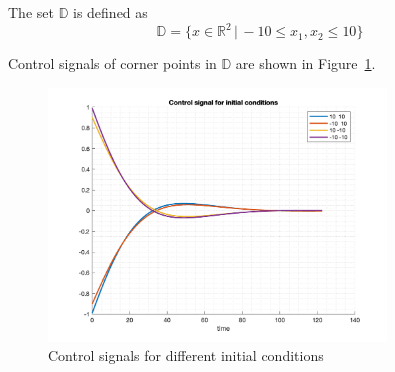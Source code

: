 The set $\mathbb{D}$ is defined as 
\begin{equation}
    \mathbb{D}=\{x\in\mathbb{R}^2\,|\,-10\leq x_1,x_2\leq 10\}
\end{equation}

Control signals of corner points in $\mathbb{D}$ are shown in Figure~\ref{fig:plot1}.
\begin{figure}[!htb]
    \centering
    \includegraphics[width=0.8\textwidth]{plot1}
    \caption{Control signals for different initial conditions}
    \label{fig:plot1}
\end{figure}
